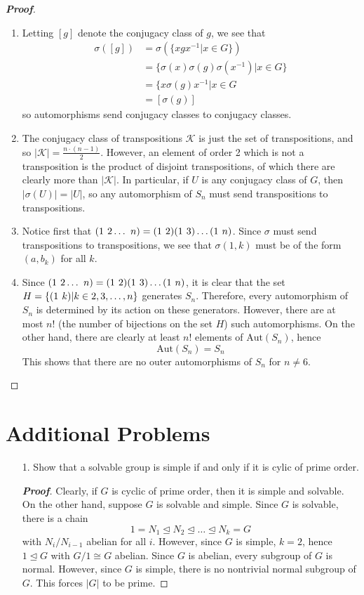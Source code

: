 \documentclass[12pt,leqno]{book}
\theoremstyle{definition}
\newenvironment{Proof}{\begin{proof}[\textnormal{\textbf{Proof}}]}{\end{proof}}
\begin{document}
\begin{enumerate}
\begin{Proof}
 \begin{enumerate}
  \item Letting $[g]$ denote the conjugacy class of $g$, we see that \begin{align*}\sigma([g])&=\sigma\left(\{xgx^{-1}|x\in G\}\right)\\&=\{\sigma(x)\sigma(g)\sigma(x^{-1})|x\in G\}\\&=\{x\sigma(g)x^{-1}|x\in G\\&=[\sigma(g)]\end{align*} so automorphisms send conjugacy classes to conjugacy classes.
  \item The conjugacy class of transpositions $\mathcal{K}$ is just the set of transpositions, and so $|\mathcal{K}|=\frac{n\cdot(n-1)}{2}$. However, an element of order 2 which is not a transposition is the product of disjoint transpositions, of which there are clearly more than $|\mathcal{K}|$. In particular, if $U$ is any conjugacy class of $G$, then $|\sigma(U)|=|U|$, so any automorphism of $S_n$ must send transpositions to transpositions.
  \item Notice first that $(1\hskip.05in 2\hdots\hskip.05in n)=(1\hskip.05in 2)(1\hskip.05in 3)\hdots(1\hskip.05in n)$. Since $\sigma$ must send transpositions to transpositions, we see that $\sigma(1,k)$ must be of the form $(a,b_k)$ for all $k$. 
  \item Since $(1\hskip.05in 2\hdots\hskip.05in n)=(1\hskip.05in 2)(1\hskip.05in 3)\hdots(1\hskip.05in n)$, it is clear that the set $H=\{(1\hskip.05in k)|k\in{2,3,\hdots, n}\}$ generates $S_n$. Therefore, every automorphism of $S_n$ is determined by its action on these generators. However, there are at most $n!$ (the number of bijections on the set $H$) such automorphisms. On the other hand, there are clearly at least $n!$ elements of $\text{Aut}(S_n)$, hence \[\text{Aut}(S_n)=S_n\] This shows that there are no outer automorphisms of $S_n$ for $n\not=6$. 
 \end{enumerate}
\end{Proof}

\end{enumerate}

\section*{Additional Problems}
\begin{enumerate}
 \item [1.] Show that a solvable group is simple if and only if it is cylic of prime order.
  \begin{Proof}
   Clearly, if $G$ is cyclic of prime order, then it is simple and solvable. On the other hand, suppose $G$ is solvable and simple. Since $G$ is solvable, there is a chain \[1=N_1\unlhd N_2\unlhd\hdots\unlhd N_k=G\] with $N_i/N_{i-1}$ abelian for all $i$. However, since $G$ is simple, $k=2$, hence $1\unlhd G$ with $G/1\cong G$ abelian. Since $G$ is abelian, every subgroup of $G$ is normal. However, since $G$ is simple, there is no nontrivial normal subgroup of $G$. This forces $|G|$ to be prime.
  \end{Proof}

\end{enumerate}
\end{document}

